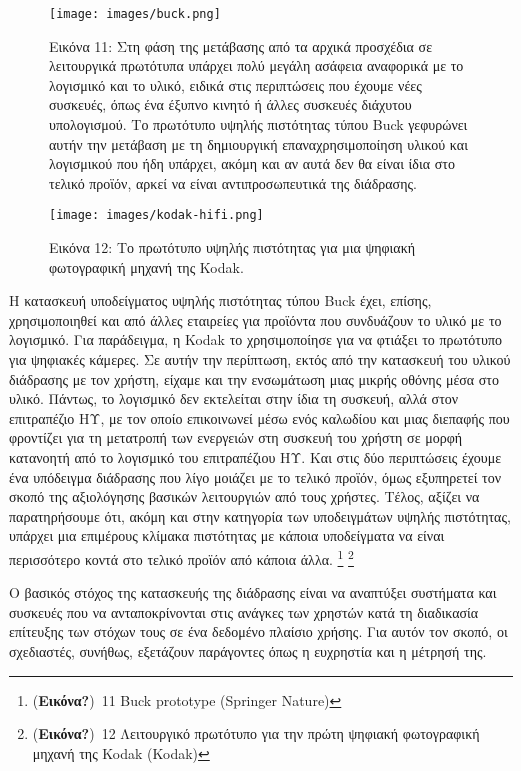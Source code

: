 \documentclass[
]{article}
\begin{document}
\leavevmode{}%
\begin{figure}
\hypertarget{fig:buck}{%
\centering
\texttt{[image: images/buck.png]}
\caption{Εικόνα 11: Στη φάση της μετάβασης από τα αρχικά προσχέδια σε
λειτουργικά πρωτότυπα υπάρχει πολύ μεγάλη ασάφεια αναφορικά με το
λογισμικό και το υλικό, ειδικά στις περιπτώσεις που έχουμε νέες
συσκευές, όπως ένα έξυπνο κινητό ή άλλες συσκευές διάχυτου υπολογισμού.
Το πρωτότυπο υψηλής πιστότητας τύπου Buck γεφυρώνει αυτήν την μετάβαση
με τη δημιουργική επαναχρησιμοποίηση υλικού και λογισμικού που ήδη
υπάρχει, ακόμη και αν αυτά δεν θα είναι ίδια στο τελικό προϊόν, αρκεί να
είναι αντιπροσωπευτικά της διάδρασης.}\label{fig:buck}
}
\end{figure}

\leavevmode{}%
\begin{figure}
\hypertarget{fig:kodak-hifi}{%
\centering
\texttt{[image: images/kodak-hifi.png]}
\caption{Εικόνα 12: Το πρωτότυπο υψηλής πιστότητας για μια ψηφιακή
φωτογραφική μηχανή της Kodak.}\label{fig:kodak-hifi}
}
\end{figure}

Η κατασκευή υποδείγματος υψηλής πιστότητας τύπου Buck έχει, επίσης,
χρησιμοποιηθεί και από άλλες εταιρείες για προϊόντα που συνδυάζουν το
υλικό με το λογισμικό. Για παράδειγμα, η Kodak το χρησιμοποίησε για να
φτιάξει το πρωτότυπο για ψηφιακές κάμερες. Σε αυτήν την περίπτωση, εκτός
από την κατασκευή του υλικού διάδρασης με τον χρήστη, είχαμε και την
ενσωμάτωση μιας μικρής οθόνης μέσα στο υλικό. Πάντως, το λογισμικό δεν
εκτελείται στην ίδια τη συσκευή, αλλά στον επιτραπέζιο ΗΥ, με τον οποίο
επικοινωνεί μέσω ενός καλωδίου και μιας διεπαφής που φροντίζει για τη
μετατροπή των ενεργειών στη συσκευή του χρήστη σε μορφή κατανοητή από το
λογισμικό του επιτραπέζιου ΗΥ. Και στις δύο περιπτώσεις έχουμε ένα
υπόδειγμα διάδρασης που λίγο μοιάζει με το τελικό προϊόν, όμως
εξυπηρετεί τον σκοπό της αξιολόγησης βασικών λειτουργιών από τους
χρήστες. Τέλος, αξίζει να παρατηρήσουμε ότι, ακόμη και στην κατηγορία
των υποδειγμάτων υψηλής πιστότητας, υπάρχει μια επιμέρους κλίμακα
πιστότητας με κάποια υποδείγματα να είναι περισσότερο κοντά στο τελικό
προϊόν από κάποια άλλα. \footnote{(\textbf{Εικόνα?})~11 Buck prototype
  (Springer Nature)} \footnote{(\textbf{Εικόνα?})~12 Λειτουργικό
  πρωτότυπο για την πρώτη ψηφιακή φωτογραφική μηχανή της Kodak (Kodak)}

Ο βασικός στόχος της κατασκευής της διάδρασης είναι να αναπτύξει
συστήματα και συσκευές που να ανταποκρίνονται στις ανάγκες των χρηστών
κατά τη διαδικασία επίτευξης των στόχων τους σε ένα δεδομένο πλαίσιο
χρήσης. Για αυτόν τον σκοπό, οι σχεδιαστές, συνήθως, εξετάζουν
παράγοντες όπως η ευχρηστία και η μέτρησή της.
\end{document}
